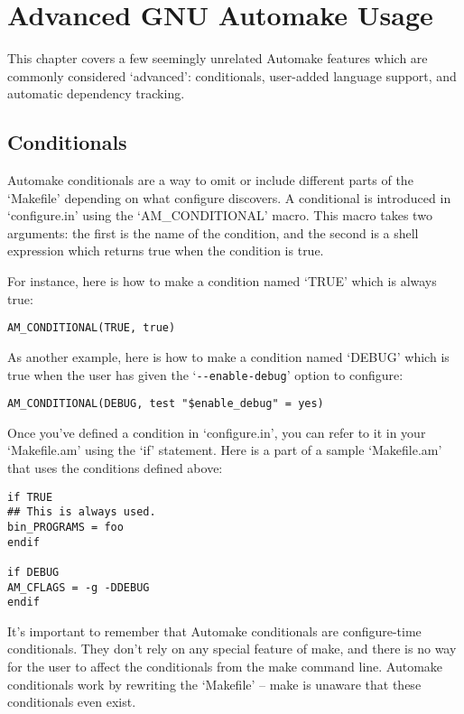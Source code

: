 \chapter{Advanced GNU Automake Usage}\label{C_Advanced_GNU_Automake_Usage}

This chapter covers a few seemingly unrelated Automake features which are commonly considered `advanced': conditionals, user-added language support, and automatic dependency tracking. 

\section{Conditionals}

Automake conditionals are a way to omit or include different parts of the `Makefile' depending on what configure discovers. A conditional is introduced in `configure.in' using the `AM\_{}CONDITIONAL' macro. This macro takes two arguments: the first is the name of the condition, and the second is a shell expression which returns true when the condition is true.

For instance, here is how to make a condition named `TRUE' which is always true: 

\begin{Verbatim}[frame=single]
AM_CONDITIONAL(TRUE, true)
\end{Verbatim}

As another example, here is how to make a condition named `DEBUG' which is true when the user has given the `\verb+--enable-debug+' option to configure:

\begin{Verbatim}[frame=single]
AM_CONDITIONAL(DEBUG, test "$enable_debug" = yes)
\end{Verbatim}

Once you've defined a condition in `configure.in', you can refer to it in your `Makefile.am' using the `if' statement. Here is a part of a sample `Makefile.am' that uses the conditions defined above:

\begin{Verbatim}[frame=single]
if TRUE
## This is always used.
bin_PROGRAMS = foo
endif

if DEBUG
AM_CFLAGS = -g -DDEBUG
endif
\end{Verbatim}

It's important to remember that Automake conditionals are configure-time conditionals. They don't rely on any special feature of make, and there is no way for the user to affect the conditionals from the make command line. Automake conditionals work by rewriting the `Makefile' -- make is unaware that these conditionals even exist.

